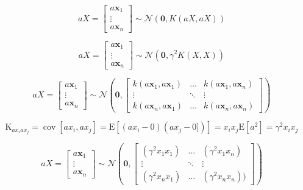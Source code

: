 \documentclass[11pt]{article}
\begin{document}
\begin{enumerate}
\begin{enumerate}[label=(\alph*)]

$$
aX=\left[\begin{array}{c}
a\mathbf{x}_{1} \\
\vdots \\
a\mathbf{x}_{n} 
\end{array}\right] \sim \mathcal{N}\left(\mathbf{0},K(aX,aX)\right)
$$

$$
aX=\left[\begin{array}{c}
a\mathbf{x}_{1} \\
\vdots \\
a\mathbf{x}_{n} 
\end{array}\right] \sim \mathcal{N}\left(\mathbf{0},\gamma^2K(X,X)\right)
$$



$$
aX=\left[\begin{array}{c}
a\mathbf{x}_{1} \\
\vdots \\
a\mathbf{x}_{n} 
\end{array}\right] \sim \mathcal{N}\left(\mathbf{0},\left[\begin{array}{ccc}
k\left(a\mathbf{x}_{1}, a\mathbf{x}_{1}\right) & \ldots & k\left(a\mathbf{x}_{1}, a\mathbf{x}_{n}\right) \\
\vdots & \ddots & \vdots \\
k\left(a\mathbf{x}_{n}, a\mathbf{x}_{1}\right) & \ldots & k\left(a\mathbf{x}_{n}, a\mathbf{x}_{n}\right)
\end{array}\right]\right)
$$

$$
\mathrm{K}_{ax_{i} ax_{j}}=\operatorname{cov}\left[ax_{i}, ax_{j}\right]=\mathrm{E}\left[\left(ax_{i}-0\right)\left(ax_{j}-0]\right)\right] = x_i x_j \mathrm{E}\left[a^2\right] = \gamma^2 x_i x_j
$$



$$
aX=\left[\begin{array}{c}
    a\mathbf{x}_{1} \\
    \vdots \\
    a\mathbf{x}_{n} 
\end{array}\right] \sim \mathcal{N}\left(\mathbf{0},\left[\begin{array}{ccc}
(\gamma^2 x_1 x_1 ) & \ldots &(\gamma^2 x_1 x_n ) \\
\vdots & \ddots & \vdots \\
(\gamma^2 x_n x_1 ) & \ldots & (\gamma^2 x_n x_n ))
\end{array}\right]\right)
$$


\end{enumerate}
\end{enumerate}
\end{document}
